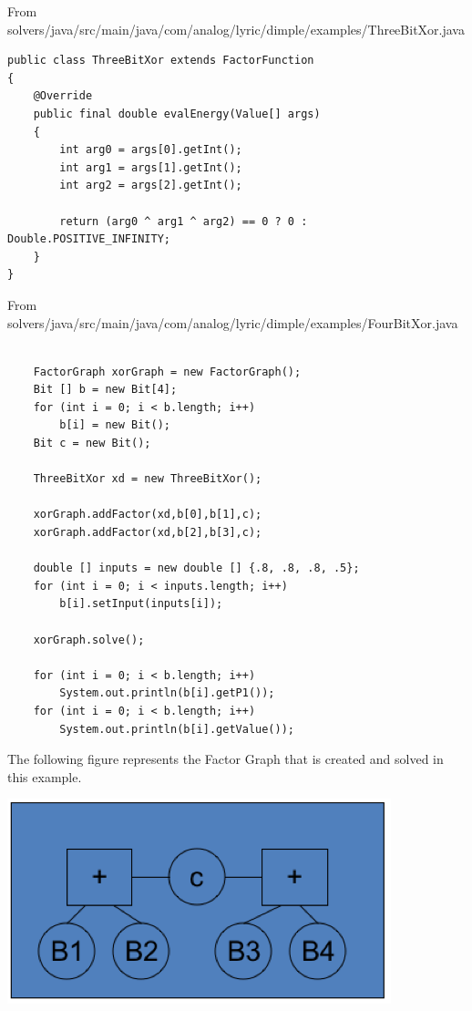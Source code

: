 \fi

\ifjava

From solvers/java/src/main/java/com/analog/lyric/dimple/examples/ThreeBitXor.java

\begin{lstlisting}
public class ThreeBitXor extends FactorFunction
{
	@Override
	public final double evalEnergy(Value[] args)
	{
		int arg0 = args[0].getInt();
		int arg1 = args[1].getInt();
		int arg2 = args[2].getInt();
		
		return (arg0 ^ arg1 ^ arg2) == 0 ? 0 : Double.POSITIVE_INFINITY;
	}
}
\end{lstlisting}

From solvers/java/src/main/java/com/analog/lyric/dimple/examples/FourBitXor.java

\begin{lstlisting}

	FactorGraph xorGraph = new FactorGraph();
	Bit [] b = new Bit[4];
	for (int i = 0; i < b.length; i++)
		b[i] = new Bit();
	Bit c = new Bit();
		
	ThreeBitXor xd = new ThreeBitXor();
		
	xorGraph.addFactor(xd,b[0],b[1],c); 
	xorGraph.addFactor(xd,b[2],b[3],c);
		
	double [] inputs = new double [] {.8, .8, .8, .5};
	for (int i = 0; i < inputs.length; i++)
		b[i].setInput(inputs[i]);
		
	xorGraph.solve();
		
	for (int i = 0; i < b.length; i++)
		System.out.println(b[i].getP1());
	for (int i = 0; i < b.length; i++)
		System.out.println(b[i].getValue());

\end{lstlisting}

\fi

The following figure represents the Factor Graph that is created and solved in this example.

\includegraphics{images/FactorGraphTemplate.png}

